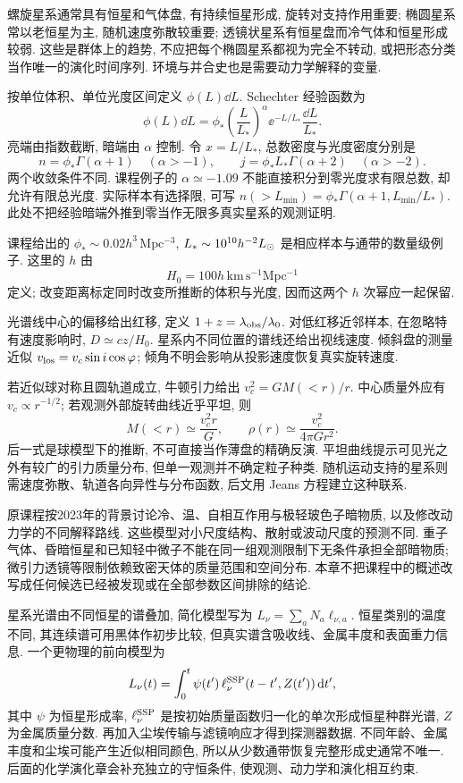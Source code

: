 螺旋星系通常具有恒星和气体盘, 有持续恒星形成, 旋转对支持作用重要; 椭圆星系常以老恒星为主, 随机速度弥散较重要; 透镜状星系有恒星盘而冷气体和恒星形成较弱. 这些是群体上的趋势, 不应把每个椭圆星系都视为完全不转动, 或把形态分类当作唯一的演化时间序列. 环境与并合史也是需要动力学解释的变量.

按单位体积、单位光度区间定义 $\phi(L)\dd L$. Schechter 经验函数为
\[
\phi(L)\dd L=\phi_*\left(\frac{L}{L_*}\right)^\alpha
\ee^{-L/L_*}\frac{\dd L}{L_*}.
\]
亮端由指数截断, 暗端由 $\alpha$ 控制. 令 $x=L/L_*$, 总数密度与光度密度分别是
\[
n=\phi_*\Gamma(\alpha+1)\quad(\alpha>-1),\qquad
j=\phi_*L_*\Gamma(\alpha+2)\quad(\alpha>-2).
\]
两个收敛条件不同. 课程例子的 $\alpha\simeq-1.09$ 不能直接积分到零光度求有限总数, 却允许有限总光度. 实际样本有选择限, 可写 $n(>L_{\min})=\phi_*\Gamma(\alpha+1,L_{\min}/L_*)$. 此处不把经验暗端外推到零当作无限多真实星系的观测证明.

课程给出的 $\phi_*\sim0.02h^3\,\mathrm{Mpc^{-3}}$, $L_*\sim10^{10}h^{-2}L_{\odot}$ 是相应样本与通带的数量级例子. 这里的 $h$ 由\[
H_0=100h\,\mathrm{km\,s^{-1}Mpc^{-1}}
\]
定义; 改变距离标定同时改变所推断的体积与光度, 因而这两个 $h$ 次幂应一起保留.

光谱线中心的偏移给出红移, 定义 $1+z=\lambda_{\rm obs}/\lambda_0$. 对低红移近邻样本, 在忽略特有速度影响时, $D\simeq cz/H_0$. 星系内不同位置的谱线还给出视线速度. 倾斜盘的测量近似 $v_{\rm los}=v_c\sin i\cos\varphi$; 倾角不明会影响从投影速度恢复真实旋转速度.

若近似球对称且圆轨道成立, 牛顿引力给出 $v_c^2=GM(<r)/r$. 中心质量外应有 $v_c\propto r^{-1/2}$; 若观测外部旋转曲线近乎平坦, 则
\[
M(<r)\simeq\frac{v_c^2r}{G},\qquad
\rho(r)\simeq\frac{v_c^2}{4\pi Gr^2}.
\]
后一式是球模型下的推断, 不可直接当作薄盘的精确反演. 平坦曲线提示可见光之外有较广的引力质量分布, 但单一观测并不确定粒子种类. 随机运动支持的星系则需速度弥散、轨道各向异性与分布函数, 后文用 Jeans 方程建立这种联系.

原课程按2023年的背景讨论冷、温、自相互作用与极轻玻色子暗物质, 以及修改动力学的不同解释路线. 这些模型对小尺度结构、散射或波动尺度的预测不同. 重子气体、昏暗恒星和已知轻中微子不能在同一组观测限制下无条件承担全部暗物质; 微引力透镜等限制依赖致密天体的质量范围和空间分布. 本章不把课程中的概述改写成任何候选已经被发现或在全部参数区间排除的结论.

星系光谱由不同恒星的谱叠加, 简化模型写为 $L_\nu=\sum_aN_a\ell_{\nu,a}$. 恒星类别的温度不同, 其连续谱可用黑体作初步比较, 但真实谱含吸收线、金属丰度和表面重力信息. 一个更物理的前向模型为
\[
L_\nu(t)=\int_0^t\psi(t')\,\ell_\nu^{\rm SSP}(t-t',Z(t'))\,\mathrm d t',
\]
其中 $\psi$ 为恒星形成率, $\ell_\nu^{\rm SSP}$ 是按初始质量函数归一化的单次形成恒星种群光谱, $Z$ 为金属质量分数. 再加入尘埃传输与滤镜响应才得到探测器数据. 不同年龄、金属丰度和尘埃可能产生近似相同颜色, 所以从少数通带恢复完整形成史通常不唯一. 后面的化学演化章会补充独立的守恒条件, 使观测、动力学和演化相互约束.
